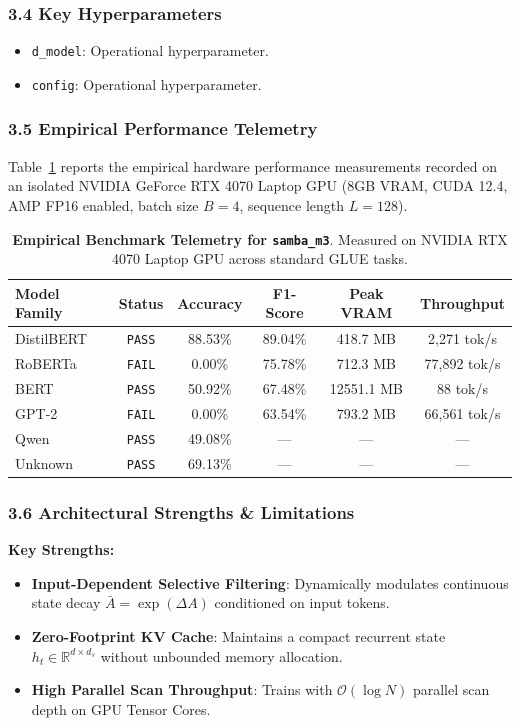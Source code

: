 \subsubsection*{3.4 Key Hyperparameters}
\begin{itemize}
    \item \texttt{d\_model}: Operational hyperparameter.
    \item \texttt{config}: Operational hyperparameter.
\end{itemize}

\subsubsection*{3.5 Empirical Performance Telemetry}
Table~\ref{tab:telemetry_samba_m3} reports the empirical hardware performance measurements recorded on an isolated NVIDIA GeForce RTX 4070 Laptop GPU (8GB VRAM, CUDA 12.4, AMP FP16 enabled, batch size $B=4$, sequence length $L=128$).

\begin{table}[h]
\centering
\small
\caption{\textbf{Empirical Benchmark Telemetry for \texttt{samba\_m3}}. Measured on NVIDIA RTX 4070 Laptop GPU across standard GLUE tasks.}
\label{tab:telemetry_samba_m3}
\begin{tabular*}{\columnwidth}{@{\extracolsep{\fill}}lccccc}
\toprule
\textbf{Model Family} & \textbf{Status} & \textbf{Accuracy} & \textbf{F1-Score} & \textbf{Peak VRAM} & \textbf{Throughput} \\
\midrule
DistilBERT & \texttt{PASS} & 88.53\% & 89.04\% & 418.7 MB & 2,271 tok/s \\
RoBERTa & \texttt{FAIL} & 0.00\% & 75.78\% & 712.3 MB & 77,892 tok/s \\
BERT & \texttt{PASS} & 50.92\% & 67.48\% & 12551.1 MB & 88 tok/s \\
GPT-2 & \texttt{FAIL} & 0.00\% & 63.54\% & 793.2 MB & 66,561 tok/s \\
Qwen & \texttt{PASS} & 49.08\% & --- & --- & --- \\
Unknown & \texttt{PASS} & 69.13\% & --- & --- & --- \\
\bottomrule
\end{tabular*}
\end{table}

\subsubsection*{3.6 Architectural Strengths \& Limitations}
\textbf{Key Strengths:}
\begin{itemize}
    \item \textbf{Input-Dependent Selective Filtering}: Dynamically modulates continuous state decay $\bar{A} = \exp(\Delta A)$ conditioned on input tokens.
    \item \textbf{Zero-Footprint KV Cache}: Maintains a compact recurrent state $h_t \in \mathbb{R}^{d \times d_s}$ without unbounded memory allocation.
    \item \textbf{High Parallel Scan Throughput}: Trains with $\mathcal{O}(\log N)$ parallel scan depth on GPU Tensor Cores.
\end{itemize}

